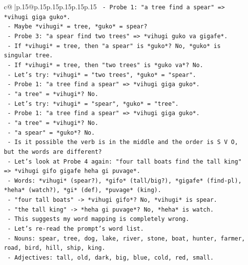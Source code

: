 \documentclass{article}
\begin{document}
{\begin{supertabular}{c@{$\;$}|p{.15\linewidth}@{}p{.15\linewidth}p{.15\linewidth}p{.15\linewidth}p{.15\linewidth}p{.15\linewidth}}
{{{\texttt{        {-} Probe 1: "a tree find a spear" => *vihugi giga guko*.} \\
\texttt{          {-} Maybe *vihugi* = tree, *guko* = spear?} \\
\texttt{          {-} Probe 3: "a spear find two trees" => *vihugi guko va gigafe*.} \\
\texttt{          {-} If *vihugi* = tree, then "a spear" is *guko*? No, *guko* is singular tree.} \\
\texttt{          {-} If *vihugi* = tree, then "two trees" is *guko va*? No.} \\
\texttt{        {-} Let's try: *vihugi* = "two trees", *guko* = "spear".} \\
\texttt{          {-} Probe 1: "a tree find a spear" => *vihugi giga guko*.} \\
\texttt{            {-} "a tree" = *vihugi*? No.} \\
\texttt{        {-} Let's try: *vihugi* = "spear", *guko* = "tree".} \\
\texttt{          {-} Probe 1: "a tree find a spear" => *vihugi giga guko*.} \\
\texttt{            {-} "a tree" = *vihugi*? No.} \\
\texttt{            {-} "a spear" = *guko*? No.} \\
\texttt{        {-} Is it possible the verb is in the middle and the order is S V O, but the words are different?} \\
\texttt{        {-} Let's look at Probe 4 again: "four tall boats find the tall king" => *vihugi gifo gigafe heha gi puvage*.} \\
\texttt{          {-} Words: *vihugi* (spear?), *gifo* (tall/big?), *gigafe* (find{-}pl), *heha* (watch?), *gi* (def), *puvage* (king).} \\
\texttt{          {-} "four tall boats" {-}> *vihugi gifo*? No, *vihugi* is spear.} \\
\texttt{          {-} "the tall king" {-}> *heha gi puvage*? No, *heha* is watch.} \\
\texttt{          {-} This suggests my word mapping is completely wrong.} \\
\texttt{          {-} Let's re{-}read the prompt's word list.} \\
\texttt{          {-} Nouns: spear, tree, dog, lake, river, stone, boat, hunter, farmer, road, bird, hill, ship, king.} \\
\texttt{          {-} Adjectives: tall, old, dark, big, blue, cold, red, small.} \\
}}}
\end{supertabular}}
\end{document}
